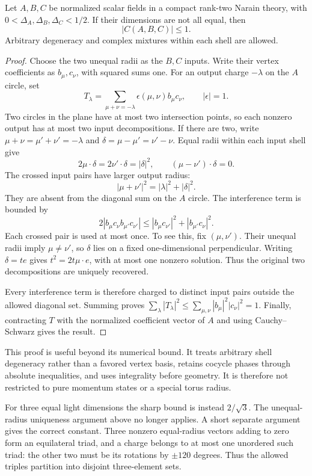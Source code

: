 \begin{theorem}
Let $A,B,C$ be normalized scalar fields in a compact rank-two Narain
theory, with $0<\Delta_A,\Delta_B,\Delta_C<1/2$. If their dimensions
are not all equal, then
\[
 |C(A,B,C)|\leq1.
\]
Arbitrary degeneracy and complex mixtures within each shell are allowed.
\end{theorem}
\begin{proof}
Choose the two unequal radii as the $B,C$ inputs. Write their vertex
coefficients as $b_\mu,c_\nu$, with squared sums one. For an output
charge $-\lambda$ on the $A$ circle, set
\[
 T_\lambda=\sum_{\mu+\nu=-\lambda}
           \epsilon(\mu,\nu)b_\mu c_\nu,
 \qquad |\epsilon|=1.
\]
Two circles in the plane have at most two intersection points, so
each nonzero output has at most two input decompositions. If there
are two, write
$\mu+\nu=\mu'+\nu'=-\lambda$ and
$\delta=\mu-\mu'=\nu'-\nu$. Equal radii within each input shell
give
\[
 2\mu\cdot\delta=2\nu'\cdot\delta=|\delta|^2,
 \qquad(\mu-\nu')\cdot\delta=0.
\]
The crossed input pairs have larger output radius:
\[
 |\mu+\nu'|^2=|\lambda|^2+|\delta|^2.
\]
They are absent from the diagonal sum on the $A$ circle. The
interference term is bounded by
\[
 2|b_\mu c_\nu b_{\mu'}c_{\nu'}|
 \leq |b_\mu c_{\nu'}|^2+|b_{\mu'}c_\nu|^2.
\]
Each crossed pair is used at most once. To see this, fix $(\mu,\nu')$.
Their unequal radii imply $\mu\ne\nu'$, so $\delta$ lies on a fixed
one-dimensional perpendicular. Writing $\delta=te$ gives
$t^2=2t\mu\cdot e$, with at most one nonzero solution. Thus the
original two decompositions are uniquely recovered.

Every interference term is therefore charged to distinct input pairs
outside the allowed diagonal set. Summing proves
$\sum_\lambda|T_\lambda|^2\leq
\sum_{\mu,\nu}|b_\mu|^2|c_\nu|^2=1$.
Finally, contracting $T$ with the normalized coefficient vector of
$A$ and using Cauchy--Schwarz gives the result.\end{proof}

This proof is useful beyond its numerical bound. It treats arbitrary
shell degeneracy rather than a favored vertex basis, retains cocycle
phases through absolute inequalities, and uses integrality before
geometry. It is therefore not restricted to pure momentum states or
a special torus radius.

For three equal light dimensions the sharp bound is instead
$2/\sqrt3$. The unequal-radius uniqueness argument above no longer
applies. A short separate argument gives the correct constant. Three
nonzero equal-radius vectors adding to zero form an equilateral
triad, and a charge belongs to at most one unordered such triad:
the other two must be its rotations by $\pm120$ degrees. Thus the
allowed triples partition into disjoint three-element sets.


